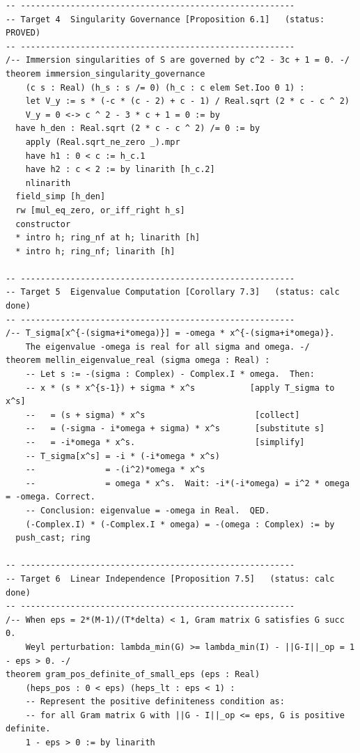 \documentclass[11pt]{article}
\begin{document}
\begin{lstlisting}[language=lean4,
  caption={Lean 4 formalization targets; \texttt{sorry} and placeholders mark unfinished obligations.}]
-- -------------------------------------------------------
-- Target 4  Singularity Governance [Proposition 6.1]   (status: PROVED)
-- -------------------------------------------------------
/-- Immersion singularities of S are governed by c^2 - 3c + 1 = 0. -/
theorem immersion_singularity_governance
    (c s : Real) (h_s : s /= 0) (h_c : c elem Set.Ioo 0 1) :
    let V_y := s * (-c * (c - 2) + c - 1) / Real.sqrt (2 * c - c ^ 2)
    V_y = 0 <-> c ^ 2 - 3 * c + 1 = 0 := by
  have h_den : Real.sqrt (2 * c - c ^ 2) /= 0 := by
    apply (Real.sqrt_ne_zero _).mpr
    have h1 : 0 < c := h_c.1
    have h2 : c < 2 := by linarith [h_c.2]
    nlinarith
  field_simp [h_den]
  rw [mul_eq_zero, or_iff_right h_s]
  constructor
  * intro h; ring_nf at h; linarith [h]
  * intro h; ring_nf; linarith [h]

-- -------------------------------------------------------
-- Target 5  Eigenvalue Computation [Corollary 7.3]   (status: calc done)
-- -------------------------------------------------------
/-- T_sigma[x^{-(sigma+i*omega)}] = -omega * x^{-(sigma+i*omega)}.
    The eigenvalue -omega is real for all sigma and omega. -/
theorem mellin_eigenvalue_real (sigma omega : Real) :
    -- Let s := -(sigma : Complex) - Complex.I * omega.  Then:
    -- x * (s * x^{s-1}) + sigma * x^s           [apply T_sigma to x^s]
    --   = (s + sigma) * x^s                      [collect]
    --   = (-sigma - i*omega + sigma) * x^s       [substitute s]
    --   = -i*omega * x^s.                        [simplify]
    -- T_sigma[x^s] = -i * (-i*omega * x^s)
    --              = -(i^2)*omega * x^s
    --              = omega * x^s.  Wait: -i*(-i*omega) = i^2 * omega = -omega. Correct.
    -- Conclusion: eigenvalue = -omega in Real.  QED.
    (-Complex.I) * (-Complex.I * omega) = -(omega : Complex) := by
  push_cast; ring

-- -------------------------------------------------------
-- Target 6  Linear Independence [Proposition 7.5]   (status: calc done)
-- -------------------------------------------------------
/-- When eps = 2*(M-1)/(T*delta) < 1, Gram matrix G satisfies G succ 0.
    Weyl perturbation: lambda_min(G) >= lambda_min(I) - ||G-I||_op = 1 - eps > 0. -/
theorem gram_pos_definite_of_small_eps (eps : Real)
    (heps_pos : 0 < eps) (heps_lt : eps < 1) :
    -- Represent the positive definiteness condition as:
    -- for all Gram matrix G with ||G - I||_op <= eps, G is positive definite.
    1 - eps > 0 := by linarith


\end{lstlisting}
\end{document}
